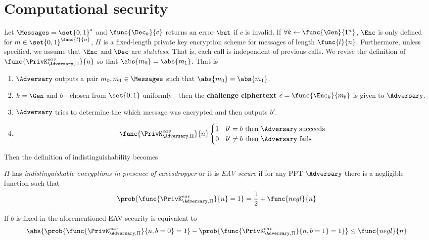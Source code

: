 \section{Computational security}
Let \(\Messages = \set{0,1}^{\ast}\) and \(\func{\Dec_k}{c}\) returns an error \(\but\) if \(c\) is invalid. If \(\forall k \gets \func{\Gen}{1^n}\), \(\Enc\) is only defined for \(m \in \set{0,1}^{\func{l}{n}}\), \(\Pi\) is a fixed-length private key encryption scheme for messages of length \(\func{l}{n}\). Furthermore, unless specified, we assume that \(\Enc\) and \(\Dec\) are \textit{stateless}. That is, each call is independent of previous calls. We revise the definition of \(\func{\PrivK_{\Adversary,\Pi}^{eav}}{n}\) so that \(\abs{m_0} = \abs{m_1}\). That is 
\begin{enumerate}
    \item \(\Adversary\) outputs a pair \(m_0,m_1 \in \Messages\) such that \(\abs{m_0} = \abs{m_1}\).
    \item \(k = \Gen\) and \(b\) - chosen from \(\set{0,1}\) uniformly - then the \textbf{challenge ciphertext} \(c = \func{\Enc_k}{m_b}\) is given to \(\Adversary\).
    \item \(\Adversary\) tries to determine the which message was encrypted and then outputs \(b'\).
    \item 
    \begin{equation*}
       \func{\PrivK_{\Adversary, \Pi}^{eav}}{n}
        \begin{cases}
           1 & b' = b \ \text{then}\  \Adversary \ \text{succeeds}\\
           0 & b' \neq b \  \text{then}\  \Adversary \ \text{fails}
        \end{cases}
    \end{equation*}
\end{enumerate}
Then the definition of indistinguishability becomes 
\begin{definition}
    \(\Pi\) has \textit{indistinguishable encryptions in presence of eavesdropper} or it is \textit{EAV-secure} if for any PPT \(\Adversary\) there is a negligible function such that
    \begin{equation*}
        \prob{\func{\PrivK_{\Adversary, \Pi}^{eav}}{n} = 1} = \frac{1}{2} + \func{negl}{n}
    \end{equation*}
\end{definition}

\begin{proposition}
    If \(b\) is fixed in the aforementioned EAV-security is equivalent to 
    \begin{equation*}
        \abs{\prob{\func{\PrivK_{\Adversary, \Pi}^{eav}}{n, b = 0} = 1} - \prob{\func{\PrivK_{\Adversary, \Pi}^{eav}}{n, b = 1} = 1}} \leq \func{negl}{n}
    \end{equation*}
\end{proposition}

